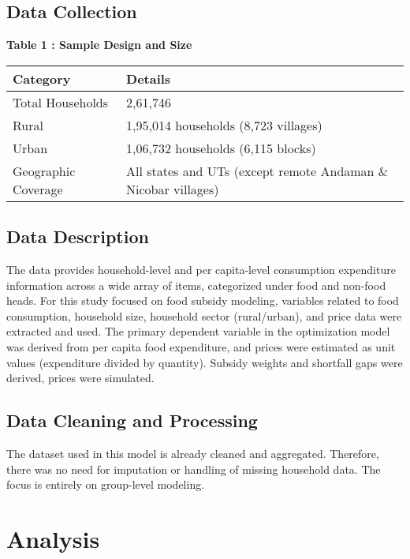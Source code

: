 \documentclass[12pt]{article}
\begin{document}
\vspace{1cm} %

\subsection{Data Collection}
\textbf{Table 1 : Sample Design and Size}

\begin{table}[h]
    \centering
    \begin{tabular}{ll}
        \toprule
        \textbf{Category} & \textbf{Details} \\
        \midrule
        Total Households & 2,61,746 \\
        Rural & 1,95,014 households (8,723 villages) \\
        Urban & 1,06,732 households (6,115 blocks) \\
        Geographic Coverage & All states and UTs (except remote Andaman \& Nicobar villages) \\
        \bottomrule
    \end{tabular}
\end{table}


\subsection{Data Description}
The data provides household-level and per capita-level consumption expenditure information across a wide array of items, categorized under food and non-food heads. For this study focused on food subsidy modeling, variables related to food consumption, household size, household sector (rural/urban), and price data were extracted and used. The primary dependent variable in the optimization model was derived from per capita food expenditure, and prices were estimated as unit values (expenditure divided by quantity). Subsidy weights and shortfall gaps were derived, prices were simulated.

\subsection{Data Cleaning and Processing}
The dataset used in this model is already cleaned and aggregated. Therefore, there was no need for imputation or handling of missing household data. The focus is entirely on group-level modeling.


\section{Analysis}
\end{document}
